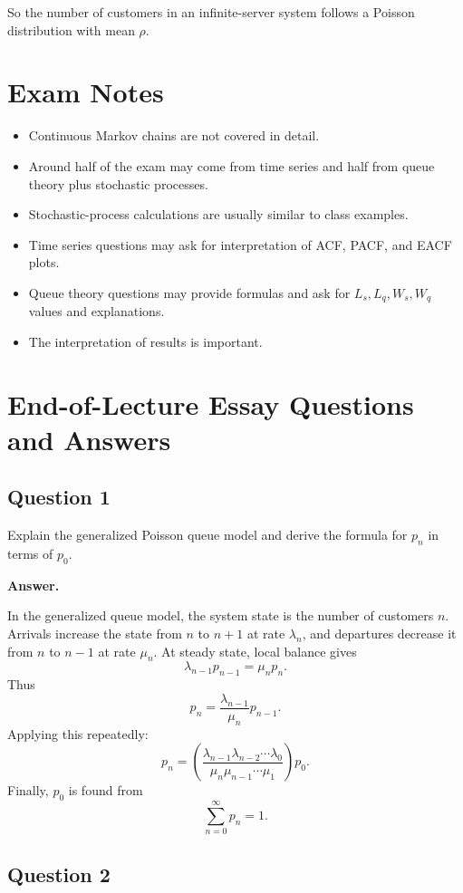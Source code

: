 \documentclass[12pt]{article}
\begin{document}
So the number of customers in an infinite-server system follows a Poisson distribution with mean \(\rho\).

\section{Exam Notes}

\begin{itemize}
    \item Continuous Markov chains are not covered in detail.
    \item Around half of the exam may come from time series and half from queue theory plus stochastic processes.
    \item Stochastic-process calculations are usually similar to class examples.
    \item Time series questions may ask for interpretation of ACF, PACF, and EACF plots.
    \item Queue theory questions may provide formulas and ask for \(L_s,L_q,W_s,W_q\) values and explanations.
    \item The interpretation of results is important.
\end{itemize}

\section{End-of-Lecture Essay Questions and Answers}

\subsection*{Question 1}

Explain the generalized Poisson queue model and derive the formula for \(p_n\) in terms of \(p_0\).

\textbf{Answer.}

In the generalized queue model, the system state is the number of customers \(n\). Arrivals increase the state from \(n\) to \(n+1\) at rate \(\lambda_n\), and departures decrease it from \(n\) to \(n-1\) at rate \(\mu_n\). At steady state, local balance gives
\[
\lambda_{n-1}p_{n-1}=\mu_np_n.
\]
Thus
\[
p_n=\frac{\lambda_{n-1}}{\mu_n}p_{n-1}.
\]
Applying this repeatedly:
\[
p_n
=
\left(
\frac{\lambda_{n-1}\lambda_{n-2}\cdots\lambda_0}
{\mu_n\mu_{n-1}\cdots\mu_1}
\right)p_0.
\]
Finally, \(p_0\) is found from
\[
\sum_{n=0}^{\infty}p_n=1.
\]

\subsection*{Question 2}
\end{document}
